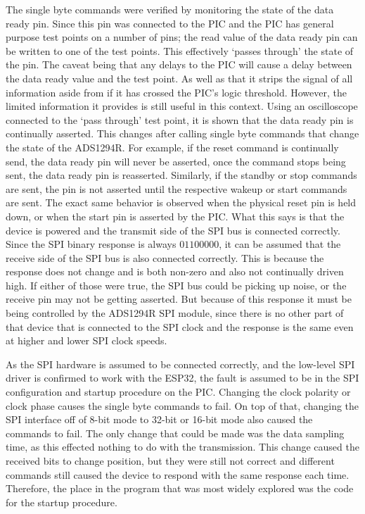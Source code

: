 The single byte commands were verified by monitoring the state of the data ready pin.
Since this pin was connected to the PIC and the PIC has general purpose test points on a number of pins;
the read value of the data ready pin can be written to one of the test points.
This effectively `passes through' the state of the pin.
The caveat being that any delays to the PIC will cause a delay between the data ready value and the test point.
As well as that it strips the signal of all information aside from if it has crossed the PIC's logic threshold.
However, the limited information it provides is still useful in this context.
Using an oscilloscope connected to the `pass through' test point, it is shown that the data ready pin is continually asserted.
This changes after calling single byte commands that change the state of the ADS1294R.
For example, if the reset command is continually send, the data ready pin will never be asserted,
once the command stops being sent, the data ready pin is reasserted.
Similarly, if the standby or stop commands are sent, the pin is not asserted until the respective wakeup or start commands are sent.
The exact same behavior is observed when the physical reset pin is held down, or when the start pin is asserted by the PIC.
What this says is that the device is powered and the transmit side of the SPI bus is connected correctly.
Since the SPI binary response is always \(01100000\), it can be assumed that the receive side of the SPI bus is also connected correctly.
This is because the response does not change and is both non-zero and also not continually driven high.
If either of those were true, the SPI bus could be picking up noise, or the receive pin may not be getting asserted.
But because of this response it must be being controlled by the ADS1294R SPI module,
since there is no other part of that device that is connected to the SPI clock and the response is the same even at higher and lower SPI clock speeds.

As the SPI hardware is assumed to be connected correctly, and the low-level SPI driver is confirmed to work with the ESP32,
the fault is assumed to be in the SPI configuration and startup procedure on the PIC.
Changing the clock polarity or clock phase causes the single byte commands to fail.
On top of that, changing the SPI interface off of 8-bit mode to 32-bit or 16-bit mode also caused the commands to fail.
The only change that could be made was the data sampling time, as this effected nothing to do with the transmission.
This change caused the received bits to change position,
but they were still not correct and different commands still caused the device to respond with the same response each time.
Therefore, the place in the program that was most widely explored was the code for the startup procedure.

